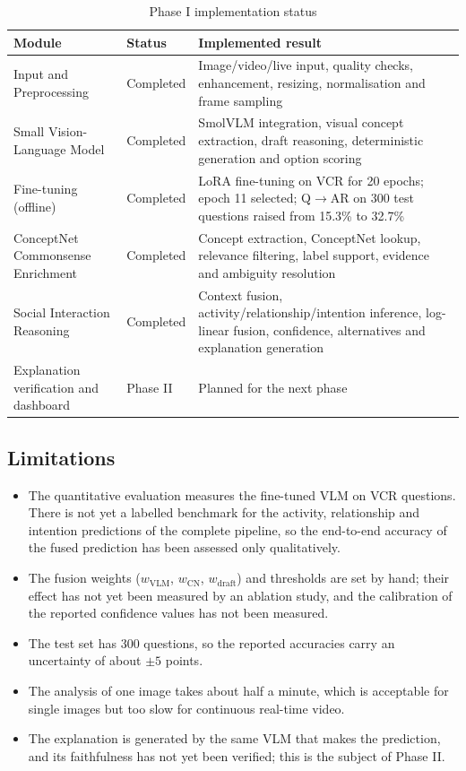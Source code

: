 \documentclass[12pt,a4paper,oneside]{report}
\newcommand{\QtoAR}{Q$\rightarrow$AR}
\begin{document}
\begin{table}[htbp]
\centering
\caption{Phase I implementation status}
\label{tab:status}
\small
\begin{tabularx}{\textwidth}{@{}p{3.6cm}p{2cm}L@{}}
\toprule
\textbf{Module} & \textbf{Status} & \textbf{Implemented result}\\
\midrule
Input and Preprocessing & Completed & Image/video/live input, quality checks, enhancement, resizing, normalisation and frame sampling\\
Small Vision-Language Model & Completed & SmolVLM integration, visual concept extraction, draft reasoning, deterministic generation and option scoring\\
Fine-tuning (offline) & Completed & LoRA fine-tuning on VCR for 20 epochs; epoch 11 selected; \QtoAR{} on 300 test questions raised from 15.3\% to 32.7\%\\
ConceptNet Commonsense Enrichment & Completed & Concept extraction, ConceptNet lookup, relevance filtering, label support, evidence and ambiguity resolution\\
Social Interaction Reasoning & Completed & Context fusion, activity/relationship/intention inference, log-linear fusion, confidence, alternatives and explanation generation\\
Explanation verification and dashboard & Phase II & Planned for the next phase\\
\bottomrule
\end{tabularx}
\end{table}

\subsection{Limitations}

\begin{itemize}[leftmargin=*]
\item The quantitative evaluation measures the fine-tuned VLM on VCR questions.
  There is not yet a labelled benchmark for the activity, relationship and
  intention predictions of the complete pipeline, so the end-to-end accuracy of
  the fused prediction has been assessed only qualitatively.
\item The fusion weights ($w_{\text{VLM}}$, $w_{\text{CN}}$, $w_{\text{draft}}$)
  and thresholds are set by hand; their effect has not yet been measured by an
  ablation study, and the calibration of the reported confidence values has not
  been measured.
\item The test set has 300 questions, so the reported accuracies carry an
  uncertainty of about $\pm 5$ points.
\item The analysis of one image takes about half a minute, which is acceptable
  for single images but too slow for continuous real-time video.
\item The explanation is generated by the same VLM that makes the prediction,
  and its faithfulness has not yet been verified; this is the subject of
  Phase II.
\end{itemize}
\end{document}
